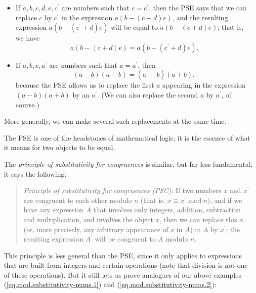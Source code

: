 \documentclass[numbers=enddot,12pt,final,onecolumn,notitlepage]{scrartcl}%
\numberwithin{exer}{subsection}
\theoremstyle{definition}
\newenvironment{statement}{\begin{quote}}{\end{quote}}
\begin{document}
\begin{itemize}
\item If $a,b,c,d,e,c^{\prime}$ are numbers such that $c=c^{\prime}$, then the
PSE says that we can replace $c$ by $c^{\prime}$ in the expression $a\left(
b-\left(  c+d\right)  e\right)  $, and the resulting expression $a\left(
b-\left(  c^{\prime}+d\right)  e\right)  $ will be equal to $a\left(
b-\left(  c+d\right)  e\right)  $; that is, we have%
\begin{equation}
a\left(  b-\left(  c+d\right)  e\right)  =a\left(  b-\left(  c^{\prime
}+d\right)  e\right)  . \label{eq.mod.substitutivity-nums.1}%
\end{equation}


\item If $a,b,c,a^{\prime}$ are numbers such that $a=a^{\prime}$, then
\begin{equation}
\left(  a-b\right)  \left(  a+b\right)  =\left(  a^{\prime}-b\right)  \left(
a+b\right)  , \label{eq.mod.substitutivity-nums.2}%
\end{equation}
because the PSE allows us to replace the first $a$ appearing in the expression
$\left(  a-b\right)  \left(  a+b\right)  $ by an $a^{\prime}$. (We can also
replace the second $a$ by $a^{\prime}$, of course.)
\end{itemize}

More generally, we can make several such replacements at the same time.

The PSE is one of the headstones of mathematical logic; it is the essence of
what it means for two objects to be equal.

The \textit{principle of substitutivity for congruences} is similar, but far
less fundamental; it says the following:

\begin{statement}
\textit{Principle of substitutivity for congruences (PSC):} If two numbers $x$
and $x^{\prime}$ are congruent to each other modulo $n$ (that is, $x\equiv
x^{\prime}\operatorname{mod}n$), and if we have any expression $A$ that
involves only integers, addition, subtraction and multiplication, and involves
the object $x$, then we can replace this $x$ (or, more precisely, any
arbitrary appearance of $x$ in $A$) in $A$ by $x^{\prime}$; the resulting
expression $A^{\prime}$ will be congruent to $A$ modulo $n$.
\end{statement}

This principle is less general than the PSE, since it only applies to
expressions that are built from integers and certain operations (note that
division is not one of these operations). But it still lets us prove analogues
of our above examples (\ref{eq.mod.substitutivity-nums.1}) and
(\ref{eq.mod.substitutivity-nums.2}):
\end{document}
